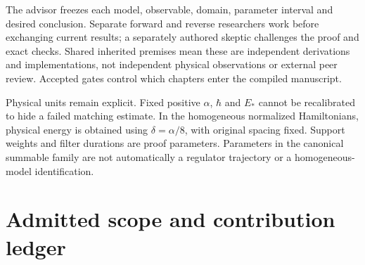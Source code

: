 \documentclass[11pt,a4paper]{article}
\begin{document}
The advisor freezes each model, observable, domain, parameter interval and desired conclusion. Separate forward and reverse researchers work before exchanging current results; a separately authored skeptic challenges the proof and exact checks. Shared inherited premises mean these are independent derivations and implementations, not independent physical observations or external peer review. Accepted gates control which chapters enter the compiled manuscript.

Physical units remain explicit. Fixed positive $\alpha$, $\hbar$ and $E_*$ cannot be recalibrated to hide a failed matching estimate. In the homogeneous normalized Hamiltonians, physical energy is obtained using $\delta=\alpha/8$, with original spacing fixed. Support weights and filter durations are proof parameters. Parameters in the canonical summable family are not automatically a regulator trajectory or a homogeneous-model identification.



\clearpage

\clearpage
\appendix
\section{Admitted scope and contribution ledger}

\clearpage

\clearpage

\end{document}

